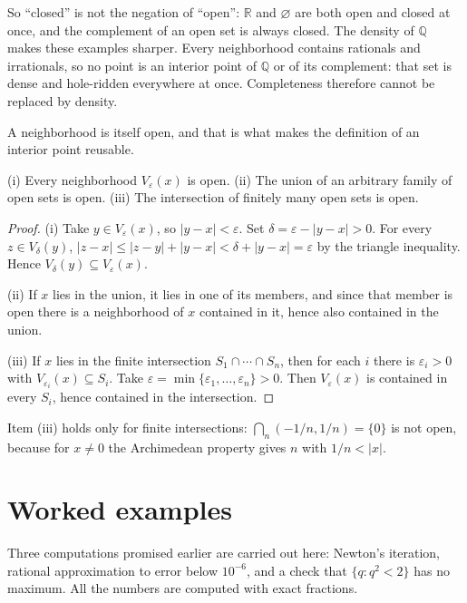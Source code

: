 So ``closed'' is not the negation of ``open'': $\mathbb{R}$ and $\varnothing$ are both
open and closed at once, and the complement of an open set is always closed. The density
of $\mathbb{Q}$ makes these examples sharper. Every neighborhood contains rationals and
irrationals, so no point is an interior point of $\mathbb{Q}$ or of its complement: that
set is dense and hole-ridden everywhere at once. Completeness therefore cannot be
replaced by density.

A neighborhood is itself open, and that is what makes the definition of an interior
point reusable.

\begin{proposisi}
(i) Every neighborhood $V_\varepsilon(x)$ is open. (ii) The union of an arbitrary
family of open sets is open. (iii) The intersection of finitely many open sets is open.
\end{proposisi}

\begin{proof}
(i) Take $y\in V_\varepsilon(x)$, so $|y-x|<\varepsilon$. Set
$\delta=\varepsilon-|y-x|>0$. For every $z\in V_\delta(y)$,
$|z-x|\le|z-y|+|y-x|<\delta+|y-x|=\varepsilon$ by the triangle inequality. Hence
$V_\delta(y)\subseteq V_\varepsilon(x)$.

(ii) If $x$ lies in the union, it lies in one of its members, and since that member is
open there is a neighborhood of $x$ contained in it, hence also contained in the union.

(iii) If $x$ lies in the finite intersection $S_1\cap\cdots\cap S_n$, then for each $i$
there is $\varepsilon_i>0$ with $V_{\varepsilon_i}(x)\subseteq S_i$. Take
$\varepsilon=\min\{\varepsilon_1,\ldots,\varepsilon_n\}>0$. Then $V_\varepsilon(x)$ is
contained in every $S_i$, hence contained in the intersection.
\end{proof}

Item (iii) holds only for finite intersections: $\bigcap_n(-1/n,1/n)=\{0\}$ is not open,
because for $x\neq0$ the Archimedean property gives $n$ with $1/n<|x|$.

\section{Worked examples}

Three computations promised earlier are carried out here: Newton's iteration, rational
approximation to error below $10^{-6}$, and a check that $\{q:q^2<2\}$ has no maximum.
All the numbers are computed with exact fractions.

